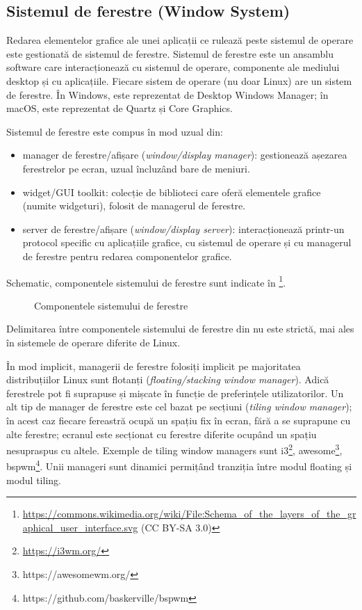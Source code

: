 \subsection{Sistemul de ferestre (Window System)}
\label{sec:ui:window-system}

Redarea elementelor grafice ale unei aplicații ce rulează peste sistemul de operare este gestionată de sistemul de ferestre. Sistemul de ferestre este un ansamblu software care interacționează cu sistemul de operare, componente ale mediului desktop și cu aplicațiile. Fiecare sistem de operare (nu doar Linux) are un sistem de ferestre. În Windows, este reprezentat de Desktop Windows Manager; în macOS, este reprezentat de Quartz și Core Graphics.

Sistemul de ferestre este compus în mod uzual din:

\begin{itemize}
  \item manager de ferestre/afișare (\textit{window/display manager}): gestionează așezarea ferestrelor pe ecran, uzual încluzând bare de meniuri.
  \item widget/GUI toolkit: colecție de biblioteci care oferă elementele grafice (numite widgeturi), folosit de managerul de ferestre.
  \item server de ferestre/afișare (\textit{window/display server}): interacționează printr-un protocol specific cu aplicațiile grafice, cu sistemul de operare și cu managerul de ferestre pentru redarea componentelor grafice.
\end{itemize}

Schematic, componentele sistemului de ferestre sunt indicate în \footnote{\url{https://commons.wikimedia.org/wiki/File:Schema_of_the_layers_of_the_graphical_user_interface.svg} (CC BY-SA 3.0)}.

\begin{figure}[htbp]
  \centering
  \def\svgwidth{\columnwidth}
  
  \caption{Componentele sistemului de ferestre}
  \label{fig:ui:window-system}
\end{figure}

Delimitarea între componentele sistemului de ferestre din  nu este strictă, mai ales în sistemele de operare diferite de Linux.

În mod implicit, managerii de ferestre folosiți implicit pe majoritatea distribuțiilor Linux sunt flotanți (\textit{floating/stacking window manager}). Adică ferestrele pot fi suprapuse și mișcate în funcție de preferințele utilizatorilor. Un alt tip de manager de ferestre este cel bazat pe secțiuni (\textit{tiling window manager}); în acest caz fiecare fereastră ocupă un spațiu fix în ecran, fără a se suprapune cu alte ferestre; ecranul este secționat cu ferestre diferite ocupând un spațiu nesupraspus cu altele. Exemple de tiling window managers sunt i3\footnote{\url{https://i3wm.org/}}, awesome\footnote{https://awesomewm.org/}, bspwm\footnote{https://github.com/baskerville/bspwm}. Unii manageri sunt dinamici permițând tranziția între modul floating și modul tiling.

